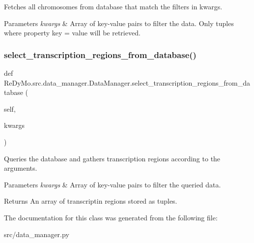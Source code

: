 Fetches all chromosomes from database that match the filters in kwargs. 


\begin{DoxyParams}{Parameters}
{\em kwargs} & Array of key-\/value pairs to filter the data. Only tuples where property key = value will be retrieved. \\
\hline
\end{DoxyParams}
\mbox{\label{classReDyMo_1_1src_1_1data__manager_1_1DataManager_acfb4a6c0196739c8afc556269ce9ab47}} 
\subsubsection{\texorpdfstring{select\+\_\+transcription\+\_\+regions\+\_\+from\+\_\+database()}{select\_transcription\_regions\_from\_database()}}
{\footnotesize\ttfamily def Re\+Dy\+Mo.\+src.\+data\+\_\+manager.\+Data\+Manager.\+select\+\_\+transcription\+\_\+regions\+\_\+from\+\_\+database (\begin{DoxyParamCaption}\item[{}]{self,  }\item[{}]{kwargs }\end{DoxyParamCaption})}



Queries the database and gathers transcription regions according to the arguments. 


\begin{DoxyParams}{Parameters}
{\em kwargs} & Array of key-\/value pairs to filter the queried data. \\
\hline
\end{DoxyParams}
\begin{DoxyReturn}{Returns}
An array of transcriptin regions stored as tuples. 
\end{DoxyReturn}


The documentation for this class was generated from the following file\+:\begin{DoxyCompactItemize}
\item 
src/data\+\_\+manager.\+py\end{DoxyCompactItemize}
